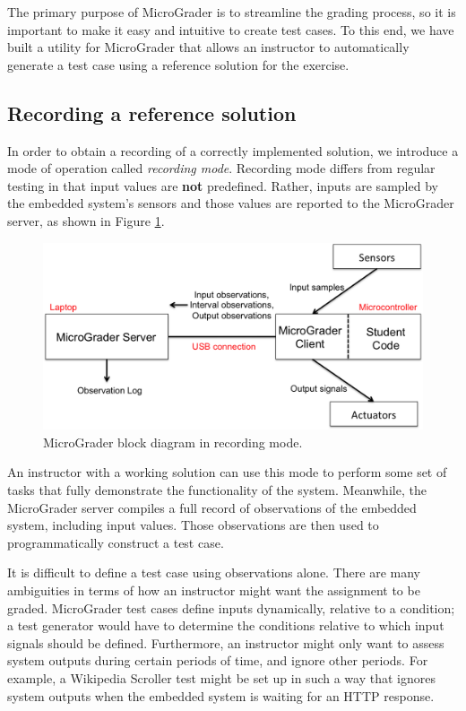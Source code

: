 \documentclass[12pt]{article}
\begin{document}
The primary purpose of MicroGrader is to streamline the grading process, so it is important to make it easy and intuitive to create test cases.  To this end, we have built a utility for MicroGrader that allows an instructor to automatically generate a test case using a reference solution for the exercise.

\subsection{Recording a reference solution}
In order to obtain a recording of a correctly implemented solution, we introduce a mode of operation called \textit{recording mode}.  Recording mode differs from regular testing in that input values are \textbf{not} predefined.  Rather, inputs are sampled by the embedded system's sensors and those values are reported to the MicroGrader server, as shown in Figure \ref{fig:recording-mode}.

\begin{figure}[ht]
\centering
\includegraphics[width=\linewidth]{recording-mode.png}
\caption{MicroGrader block diagram in recording mode.}
\label{fig:recording-mode}
\end{figure}

An instructor with a working solution can use this mode to perform some set of tasks that fully demonstrate the functionality of the system.  Meanwhile, the MicroGrader server compiles a full record of observations of the embedded system, including input values.  Those observations are then used to programmatically construct a test case.

It is difficult to define a test case using observations alone.  There are many ambiguities in terms of how an instructor might want the assignment to be graded.  MicroGrader test cases define inputs dynamically, relative to a condition; a test generator would have to determine the conditions relative to which input signals should be defined.  Furthermore, an instructor might only want to assess system outputs during certain periods of time, and ignore other periods.  For example, a Wikipedia Scroller test might be set up in such a way that ignores system outputs when the embedded system is waiting for an HTTP response.
\end{document}
